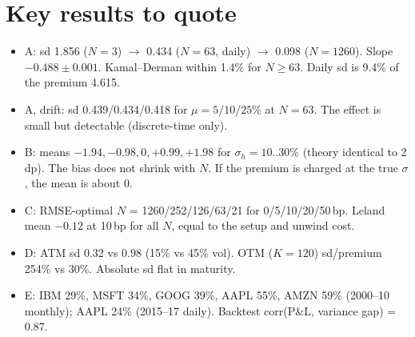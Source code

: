 \documentclass[10.5pt,a4paper]{article}
\begin{document}
\section{Key results to quote}
\begin{itemize}
\item A: sd 1.856 ($N=3$) $\to$ 0.434 ($N=63$, daily) $\to$ 0.098 ($N=1260$). Slope $-0.488\pm0.001$. Kamal--Derman within 1.4\% for $N\ge63$. Daily sd is 9.4\% of the premium 4.615.
\item A, drift: sd 0.439/0.434/0.418 for $\mu=5/10/25\%$ at $N=63$. The effect is small but detectable (discrete-time only).
\item B: means $-1.94,-0.98,0,+0.99,+1.98$ for $\sigma_h=10..30\%$ (theory identical to 2 dp). The bias does not shrink with $N$. If the premium is charged at the true $\sigma$, the mean is about 0.
\item C: RMSE-optimal $N$ = 1260/252/126/63/21 for 0/5/10/20/50\,bp. Leland mean $-0.12$ at 10\,bp for all $N$, equal to the setup and unwind cost.
\item D: ATM sd 0.32 vs 0.98 (15\% vs 45\% vol). OTM ($K=120$) sd/premium 254\% vs 30\%. Absolute sd flat in maturity.
\item E: IBM 29\%, MSFT 34\%, GOOG 39\%, AAPL 55\%, AMZN 59\% (2000--10 monthly); AAPL 24\% (2015--17 daily). Backtest corr(P\&L, variance gap) = 0.87.
\end{itemize}
\end{document}
